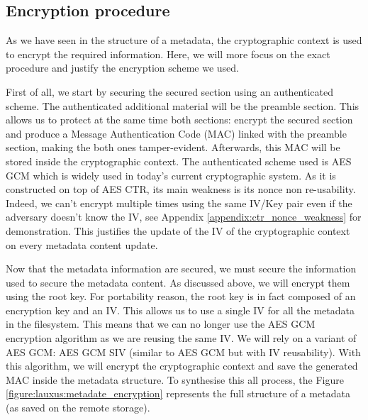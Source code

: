 \documentclass[../main.tex]{subfiles}
\begin{document}
\subsection{Encryption procedure}
\label{section:lauxus:metadata_encryption}

\par As we have seen in the structure of a metadata, the cryptographic context is used to encrypt the required information. Here, we will more focus on the exact procedure and justify the encryption scheme we used.
\par First of all, we start by securing the secured section using an authenticated scheme. The authenticated additional material will be the preamble section. This allows us to protect at the same time both sections: encrypt the secured section and produce a Message Authentication Code (MAC) linked with the preamble section, making the both ones tamper-evident. Afterwards, this MAC will be stored inside the cryptographic context. The authenticated scheme used is AES GCM which is widely used in today's current cryptographic system. As it is constructed on top of AES CTR, its main weakness is its nonce non re-usability. Indeed, we can't encrypt multiple times using the same IV/Key pair even if the adversary doesn't know the IV, see Appendix \ref{appendix:ctr_nonce_weakness} for demonstration. This justifies the update of the IV of the cryptographic context on every metadata content update.
\par Now that the metadata information are secured, we must secure the information used to secure the metadata content. As discussed above, we will encrypt them using the root key. For portability reason, the root key is in fact composed of an encryption key and an IV. This allows us to use a single IV for all the metadata in the filesystem. This means that we can no longer use the AES GCM encryption algorithm as we are reusing the same IV. We will rely on a variant of AES GCM: AES GCM SIV (similar to AES GCM but with IV reusability). With this algorithm, we will encrypt the cryptographic context and save the generated MAC inside the metadata structure. To synthesise this all process, the Figure \ref{figure:lauxus:metadate_encryption} represents the full structure of a metadata (as saved on the remote storage).
\end{document}
